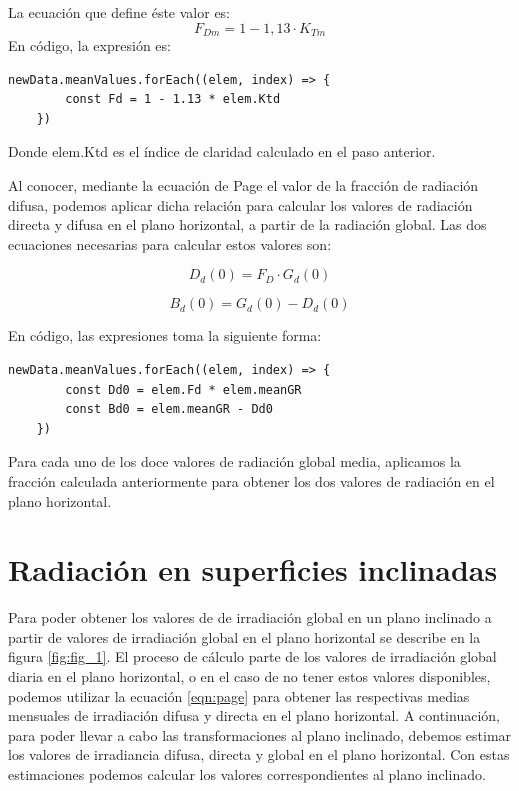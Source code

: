 La ecuación que define éste valor es:
\begin{equation}\label{eqn:page}
F_{Dm}=1-1,13·K_{Tm}
\end{equation}
En código, la expresión es:
\begin{lstlisting}[style=ES6, caption={Fracción de difusa}]
	newData.meanValues.forEach((elem, index) => {
		const Fd = 1 - 1.13 * elem.Ktd
	})
\end{lstlisting}
Donde elem.Ktd es el índice de claridad calculado en el paso anterior.

Al conocer, mediante la ecuación de Page el valor de la fracción de radiación difusa, podemos aplicar dicha relación para calcular los valores de radiación directa y difusa en el plano horizontal, a partir de la radiación global.
Las dos ecuaciones necesarias para calcular estos valores son:

\begin{equation}
\label{eqn:rad_difusa}
D_d(0) = F_D · G_d(0)
\end{equation}

\begin{equation}
\label{eqn:rad_directa}
B_d(0) = G_d(0) - D_d(0)
\end{equation}

En código, las expresiones toma la siguiente forma:
\begin{lstlisting}[style=ES6, caption={Radiación directa y difusa}]
	newData.meanValues.forEach((elem, index) => {
		const Dd0 = elem.Fd * elem.meanGR
		const Bd0 = elem.meanGR - Dd0
	})
\end{lstlisting}

Para cada uno de los doce valores de radiación global media, aplicamos la fracción calculada anteriormente para obtener los dos valores de radiación en el plano horizontal.

\section{Radiación en superficies inclinadas}

Para poder obtener los valores de de irradiación global en un plano inclinado a partir de valores de irradiación global en el plano horizontal se describe en la figura \ref{fig:fig_1}. El proceso de cálculo parte de los valores de irradiación global diaria en el plano horizontal, o en el caso de no tener estos valores disponibles, podemos utilizar la ecuación \ref{eqn:page} para obtener las respectivas medias mensuales de irradiación difusa y directa en el plano horizontal.
A continuación, para poder llevar a cabo las transformaciones al plano inclinado, debemos estimar los valores de irradiancia difusa, directa y global en el plano horizontal. Con estas estimaciones podemos calcular los valores correspondientes al plano inclinado.

